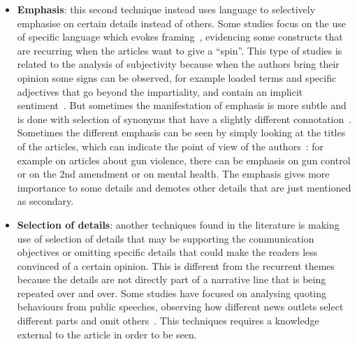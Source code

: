 \begin{itemize}
    \item \textbf{Emphasis}: this second technique instead uses language to selectively emphasise on certain details instead of others.
    Some studies focus on the use of specific language which evokes framing~\cite{baumer2015testing}, evidencing some constructs that are recurring when the articles want to give a ``spin''.
    This type of studies is related to the analysis of subjectivity because when the authors bring their opinion some signs can be observed, for example loaded terms and specific adjectives that go beyond the impartiality, and contain an implicit sentiment~\cite{greene2009more}.
    But sometimes the manifestation of emphasis is more subtle and is done with selection of synonyms that have a slightly different connotation~\cite{schuldt2011global,rugg1941experiments,tversky1981framing}.
    Sometimes the different emphasis can be seen by simply looking at the titles of the articles, which can indicate the point of
    view of the authors~\cite{liu2019detecting}: for example on articles about gun violence, there can be emphasis on gun control or on the 2nd amendment or on mental health.
    The emphasis gives more importance to some details and demotes other details that are just mentioned as secondary.
    
    
    \item \textbf{Selection of details}: another techniques found in the literature is making use of selection of details that may be supporting the communication objectives or omitting specific details that could make the readers less convinced of a certain opinion. This is different from the recurrent themes because the details are not directly part of a narrative line that is being repeated over and over.
    Some studies have focused on analysing quoting behaviours from public speeches, observing how different news outlets select different parts and omit others~\cite{niculae2015quotus}.
    This techniques requires a knowledge external to the article in order to be seen.


\end{itemize}
